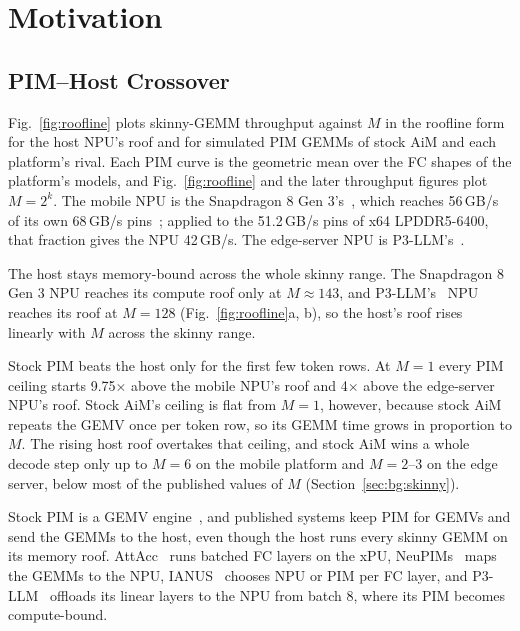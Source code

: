 \section{Motivation}
\label{sec:motiv}

\subsection{PIM--Host Crossover}
\label{sec:bg:roofline}

Fig.~\ref{fig:roofline} plots skinny-GEMM throughput against $M$ in the roofline form~\cite{roofline} for the host
NPU's roof and for simulated PIM GEMMs of stock AiM and each platform's rival. Each PIM curve is the geometric mean over
the FC shapes of the platform's models, and Fig.~\ref{fig:roofline} and the later throughput figures plot $M = 2^k$.
The mobile NPU is the Snapdragon 8 Gen 3's~\cite{sd8g3}, which reaches 56\,GB/s~\cite{powerinfer2} of its own
68\,GB/s pins~\cite{heterollm}; applied to the 51.2\,GB/s pins of x64 LPDDR5-6400, that fraction gives the NPU
42\,GB/s\ASSUMPTION. The edge-server NPU is P3-LLM's~\cite{p3llm}.

The host stays memory-bound across the whole skinny range. The Snapdragon 8 Gen 3 NPU reaches its compute
roof only at $M \approx 143$, and P3-LLM's~\cite{p3llm} NPU reaches its roof at $M = 128$ (Fig.~\ref{fig:roofline}a,
b), so the host's roof rises linearly with $M$ across the skinny range.

Stock PIM beats the host only for the first few token rows. At $M = 1$ every PIM ceiling starts 9.75$\times$ above the
mobile NPU's roof and 4$\times$ above the edge-server NPU's roof. Stock AiM's ceiling is flat from $M = 1$, however,
because stock AiM repeats the GEMV once per token row, so its GEMM time grows in proportion to $M$. The rising host roof overtakes that ceiling, and stock
AiM wins a whole decode step only up to $M = 6$ on the mobile platform and $M = 2$--3 on the edge server, below most of
the published values of $M$ (Section~\ref{sec:bg:skinny}).

Stock PIM is a GEMV engine~\cite{hbmpim,hc35pim,aimjssc,aimhc34}, and published systems keep PIM for GEMVs and send the GEMMs to the host, even though the
host runs every skinny GEMM on its memory roof. AttAcc~\cite{attacc} runs batched FC layers on the xPU,
NeuPIMs~\cite{neupims} maps the GEMMs to the NPU, IANUS~\cite{ianus} chooses NPU or PIM per FC layer, and
P3-LLM~\cite{p3llm} offloads its linear layers to the NPU from batch 8, where its PIM becomes compute-bound.

